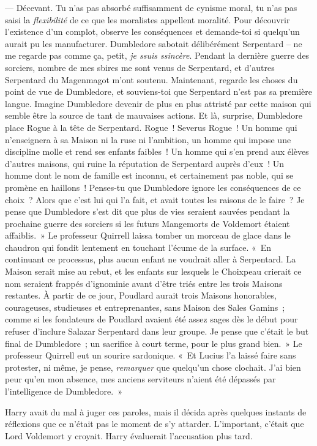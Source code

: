 --- Décevant. Tu n'as pas absorbé suffisamment de cynisme moral, tu n'as pas saisi la \emph{flexibilité} de ce que les moralistes appellent moralité. Pour découvrir l'existence d'un complot, observe les conséquences et demande-toi si quelqu'un aurait pu les manufacturer. Dumbledore sabotait délibérément Serpentard -- ne me regarde pas comme ça, petit, \emph{je ssuis ssincère}. Pendant la dernière guerre des sorciers, nombre de mes sbires me sont venus de Serpentard, et d'autres Serpentard du Magenmagot m'ont soutenu. Maintenant, regarde les choses du point de vue de Dumbledore, et souviens-toi que Serpentard n'est pas sa première langue. Imagine Dumbledore devenir de plus en plus attristé par cette maison qui semble être la source de tant de mauvaises actions. Et là, surprise, Dumbledore place Rogue à la tête de Serpentard. Rogue~! Severus Rogue~! Un homme qui n'enseignera à sa Maison ni la ruse ni l'ambition, un homme qui impose une discipline molle et rend ses enfants faibles~! Un homme qui s'en prend aux élèves d'autres maisons, qui ruine la réputation de Serpentard auprès d'eux~! Un homme dont le nom de famille est inconnu, et certainement pas noble, qui se promène en haillons~! Penses-tu que Dumbledore ignore les conséquences de ce choix~? Alors que c'est lui qui l'a fait, et avait toutes les raisons de le faire~? Je pense que Dumbledore s'est dit que plus de vies seraient sauvées pendant la prochaine guerre des sorciers si les futurs Mangemorts de Voldemort étaient affaiblis.~» Le professeur Quirrell laissa tomber un morceau de glace dans le chaudron qui fondit lentement en touchant l'écume de la surface. «~En continuant ce processus, plus aucun enfant ne voudrait aller à Serpentard. La Maison serait mise au rebut, et les enfants sur lesquels le Choixpeau crierait ce nom seraient frappés d'ignominie avant d'être triés entre les trois Maisons restantes. À partir de ce jour, Poudlard aurait trois Maisons honorables, courageuses, studieuses et entreprenantes, sans Maison des Sales Gamins~; comme si les fondateurs de Poudlard avaient été assez sages dès le début pour refuser d'inclure Salazar Serpentard dans leur groupe. Je pense que c'était le but final de Dumbledore~; un sacrifice à court terme, pour le plus grand bien.~» Le professeur Quirrell eut un sourire sardonique. «~Et Lucius l'a laissé faire sans protester, ni même, je pense, \emph{remarquer} que quelqu'un chose clochait. J'ai bien peur qu'en mon absence, mes anciens serviteurs n'aient été dépassés par l'intelligence de Dumbledore.~»

Harry avait du mal à juger ces paroles, mais il décida après quelques instants de réflexions que ce n'était pas le moment de s'y attarder. L'important, c'était que Lord Voldemort y croyait. Harry évaluerait l'accusation plus tard.

